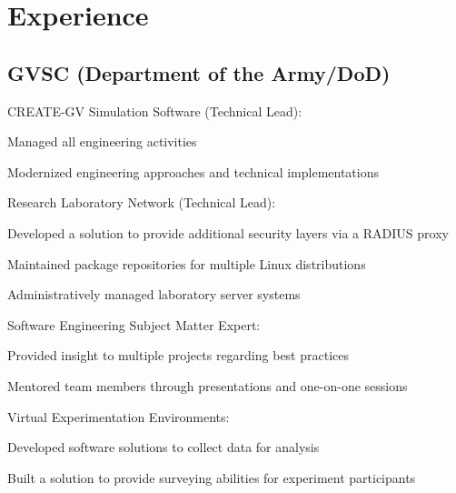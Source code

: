 \documentclass[]{formatting}
\begin{document}
\begin{minipage}[t]{0.66\textwidth}


\section{Experience}

\subsection{GVSC (Department of the Army/DoD)}
\vspace{2pt} 
CREATE-GV Simulation Software (Technical Lead):
\\
\vspace{8pt}
\begin{tightemize}
\item Managed all engineering activities
\item Modernized engineering approaches and technical implementations
\end{tightemize}
Research Laboratory Network (Technical Lead):
\\
\begin{tightemize}
\item Developed a solution to provide additional security layers via a RADIUS proxy
\item Maintained package repositories for multiple Linux distributions
\item Administratively managed laboratory server systems
\end{tightemize}
Software Engineering Subject Matter Expert:
\\
\begin{tightemize}
\item Provided insight to multiple projects regarding best practices
\item Mentored team members through presentations and one-on-one sessions
\end{tightemize}
Virtual Experimentation Environments:
\\
\begin{tightemize}
\item Developed software solutions to collect data for analysis
\item Built a solution to provide surveying abilities for experiment participants
\end{tightemize}
\sectionsep


\end{minipage}
\end{document}
